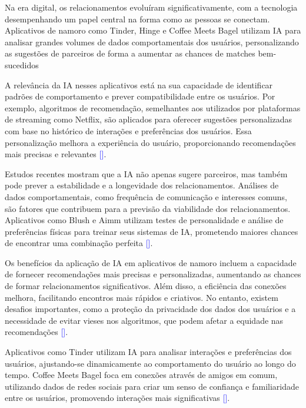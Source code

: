 Na era digital, os relacionamentos evoluíram significativamente, com a tecnologia desempenhando um papel central na forma como as pessoas se conectam. Aplicativos de namoro como Tinder, Hinge e Coffee Meets Bagel utilizam IA para analisar grandes volumes de dados comportamentais dos usuários, personalizando as sugestões de parceiros de forma a aumentar as chances de matches bem-sucedidos​

A relevância da IA nesses aplicativos está na sua capacidade de identificar padrões de comportamento e prever compatibilidade entre os usuários. Por exemplo, algoritmos de recomendação, semelhantes aos utilizados por plataformas de streaming como Netflix, são aplicados para oferecer sugestões personalizadas com base no histórico de interações e preferências dos usuários. Essa personalização melhora a experiência do usuário, proporcionando recomendações mais precisas e relevantes \textcolor{blue}{[\cite{Bonilla2023}]}.

Estudos recentes mostram que a IA não apenas sugere parceiros, mas também pode prever a estabilidade e a longevidade dos relacionamentos. Análises de dados comportamentais, como frequência de comunicação e interesses comuns, são fatores que contribuem para a previsão da viabilidade dos relacionamentos. Aplicativos como Blush e Aimm utilizam testes de personalidade e análise de preferências físicas para treinar seus sistemas de IA, prometendo maiores chances de encontrar uma combinação perfeita \textcolor{blue}{[\cite{Finkel2012, Bonilla2023}]}.

Os benefícios da aplicação de IA em aplicativos de namoro incluem a capacidade de fornecer recomendações mais precisas e personalizadas, aumentando as chances de formar relacionamentos significativos. Além disso, a eficiência das conexões melhora, facilitando encontros mais rápidos e criativos. No entanto, existem desafios importantes, como a proteção da privacidade dos dados dos usuários e a necessidade de evitar vieses nos algoritmos, que podem afetar a equidade nas recomendações \textcolor{blue}{[\cite{Saban2024, Sharabi2022}]}.

Aplicativos como Tinder utilizam IA para analisar interações e preferências dos usuários, ajustando-se dinamicamente ao comportamento do usuário ao longo do tempo. Coffee Meets Bagel foca em conexões através de amigos em comum, utilizando dados de redes sociais para criar um senso de confiança e familiaridade entre os usuários, promovendo interações mais significativas \textcolor{blue}{[\cite{Saban2024}]}.

